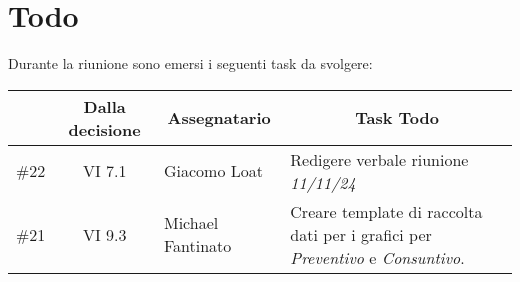 

\section{Todo}

Durante la riunione sono emersi i seguenti task da svolgere:

\vspace{0.5cm}

\begin{table}[htbp]
\centering
{}
\begin{tabular}{|c|c|p{}|p{}|}
    \hline
    \rowcolor[gray]{0.75}
    \multicolumn{1}{|c|}{\textbf{Codice}} & \multicolumn{1}{|c|}{\textbf{Dalla decisione}} & \multicolumn{1}{|c|}{\textbf{Assegnatario}} & \multicolumn{1}{|c|}{\textbf{Task Todo}} \\
    \hline
    \#22 & VI 7.1 & Giacomo Loat & Redigere verbale riunione \emph{11/11/24} \\
    \hline
    \#21 & VI 9.3 & Michael Fantinato & Creare template di raccolta dati per i grafici per \emph{Preventivo} e \emph{Consuntivo}. \\
    \hline
\end{tabular}
\end{table}
